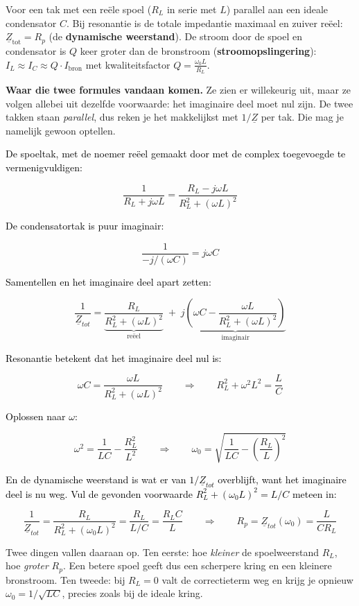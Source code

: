 \documentclass[a4paper,11pt]{article}
\newcommand{\stapreden}[1]{\par\vspace{1.4mm}\noindent\textcolor{black}{#1}\par\vspace{-2mm}}
\begin{document}
{Voor een tak met een reële spoel ($R_L$ in serie met $L$) parallel aan een ideale condensator $C$.
    Bij resonantie is de totale impedantie maximaal en zuiver reëel: $\underline{Z}_{\text{tot}} = R_p$ (de \textbf{dynamische weerstand}).
    De stroom door de spoel en condensator is $Q$ keer groter dan de bronstroom (\textbf{stroomopslingering}):
    $I_L \approx I_C \approx Q \cdot I_{\text{bron}}$ met kwaliteitsfactor $Q = \frac{\omega_0 L}{R_L}$.}

\textbf{Waar die twee formules vandaan komen.} Ze zien er willekeurig uit, maar ze volgen allebei
uit dezelfde voorwaarde: het imaginaire deel moet nul zijn. De twee takken staan \emph{parallel},
dus reken je het makkelijkst met $1/\underline{Z}$ per tak. Die mag je namelijk gewoon optellen.

\stapreden{De spoeltak, met de noemer reëel gemaakt door met de complex toegevoegde te vermenigvuldigen:}
\[\frac{1}{R_L + j\omega L}
    = \frac{R_L - j\omega L}{R_L^2 + (\omega L)^2}\]

\stapreden{De condensatortak is puur imaginair:}
\[\frac{1}{-j/(\omega C)} = j\omega C\]

\stapreden{Samentellen en het imaginaire deel apart zetten:}
\[\frac{1}{\underline{Z}_{tot}} = \underbrace{\frac{R_L}{R_L^2 + (\omega L)^2}}_{\text{re\"eel}}
    \;+\; j\underbrace{\left(\omega C - \frac{\omega L}{R_L^2 + (\omega L)^2}\right)}_{\text{imaginair}}\]

\stapreden{Resonantie betekent dat het imaginaire deel nul is:}
\[\omega C = \frac{\omega L}{R_L^2 + (\omega L)^2}
    \qquad\Longrightarrow\qquad
    R_L^2 + \omega^2L^2 = \frac{L}{C}\]

\stapreden{Oplossen naar $\omega$:}
\[\omega^2 = \frac{1}{LC} - \frac{R_L^2}{L^2}
    \qquad\Longrightarrow\qquad
    \boxed{\omega_0 = \sqrt{\frac{1}{LC} - \left(\frac{R_L}{L}\right)^2}}\]

\stapreden{En de dynamische weerstand is wat er van $1/\underline{Z}_{tot}$ overblijft, want het imaginaire deel is nu weg. Vul de gevonden voorwaarde $R_L^2 + (\omega_0 L)^2 = L/C$ meteen in:}
\[\frac{1}{\underline{Z}_{tot}} = \frac{R_L}{R_L^2 + (\omega_0 L)^2} = \frac{R_L}{L/C} = \frac{R_L C}{L}
    \qquad\Longrightarrow\qquad
    \boxed{R_p = \underline{Z}_{tot}(\omega_0) = \frac{L}{C R_L}}\]

Twee dingen vallen daaraan op. Ten eerste: hoe \emph{kleiner} de spoelweerstand $R_L$, hoe
\emph{groter} $R_p$. Een betere spoel geeft dus een scherpere kring en een kleinere bronstroom.
Ten tweede: bij $R_L = 0$ valt de correctieterm weg en krijg je opnieuw $\omega_0 = 1/\sqrt{LC}$,
precies zoals bij de ideale kring.
\end{document}
